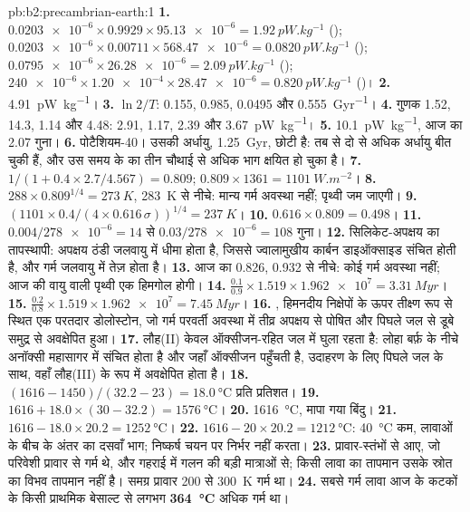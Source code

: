 \begin{solution}{pb:b2:precambrian-earth:1}
\textbf{1.} $\num{0.0203e-6}\times0.9929\times\num{95.13e-6} = \qty{1.92}{pW.kg^{-1}}$
(); $\num{0.0203e-6}\times0.00711\times\num{568.47e-6} = \qty{0.0820}{pW.kg^{-1}}$
(); $\num{0.0795e-6}\times\num{26.28e-6} = \qty{2.09}{pW.kg^{-1}}$ ();
$\num{240e-6}\times\num{1.20e-4}\times\num{28.47e-6} = \qty{0.820}{pW.kg^{-1}}$ ()।
\textbf{2.} \qty{4.91}{pW.kg^{-1}}।
\textbf{3.} $\ln2/T$: 0.155, 0.985, 0.0495 और \qty{0.555}{Gyr^{-1}}।
\textbf{4.} गुणक 1.52, 14.3, 1.14 और 4.48: 2.91, 1.17, 2.39 और \qty{3.67}{pW.kg^{-1}}।
\textbf{5.} \qty{10.1}{pW.kg^{-1}}, आज का 2.07 गुना।
\textbf{6.} पोटैशियम-40। उसकी अर्धायु, \qty{1.25}{Gyr}, छोटी है: तब से दो से अधिक अर्धायु
बीत चुकी हैं, और उस समय के  का तीन चौथाई से अधिक भाग क्षयित हो चुका है।
\textbf{7.} $1/(1 + 0.4\times2.7/4.567) = 0.809$; $0.809\times1361 = \qty{1101}{W.m^{-2}}$।
\textbf{8.} $288\times0.809^{1/4} = \qty{273}{K}$, \qty{283}{K} से नीचे: मान्य गर्म अवस्था नहीं;
पृथ्वी जम जाएगी।
\textbf{9.} $(1101\times0.4/(4\times0.616\,\sigma))^{1/4} = \qty{237}{K}$।
\textbf{10.} $0.616\times0.809 = 0.498$।
\textbf{11.} $0.004/\num{278e-6} = 14$ से $0.03/\num{278e-6} = 108$ गुना।
\textbf{12.} सिलिकेट-अपक्षय का तापस्थापी: अपक्षय ठंडी जलवायु में धीमा होता है, जिससे
ज्वालामुखीय कार्बन डाइऑक्साइड संचित होती है, और गर्म जलवायु में तेज़ होता है।
\textbf{13.} आज का 0.826, 0.932 से नीचे: कोई गर्म अवस्था नहीं; आज की वायु वाली पृथ्वी एक
हिमगोल होगी।
\textbf{14.} $\frac{0.1}{0.9}\times1.519\times\num{1.962e7} = \qty{3.31}{Myr}$।
\textbf{15.} $\frac{0.2}{0.8}\times1.519\times\num{1.962e7} = \qty{7.45}{Myr}$।
\textbf{16.} , हिमनदीय निक्षेपों के ऊपर तीक्ष्ण रूप से स्थित एक परतदार डोलोस्टोन,
जो गर्म परवर्ती अवस्था में तीव्र अपक्षय से पोषित और पिघले जल से डूबे समुद्र से
अवक्षेपित हुआ।
\textbf{17.} लौह(II) केवल ऑक्सीजन-रहित जल में घुला रहता है: लोहा बर्फ़ के नीचे
अनॉक्सी महासागर में संचित होता है और जहाँ ऑक्सीजन पहुँचती है, उदाहरण के लिए पिघले
जल के साथ, वहाँ लौह(III) के रूप में अवक्षेपित होता है।
\textbf{18.} $(1616 - 1450)/(32.2 - 23) = \qty{18.0}{\celsius}$ प्रति प्रतिशत।
\textbf{19.} $1616 + 18.0\times(30 - 32.2) = \qty{1576}{\celsius}$।
\textbf{20.} \qty{1616}{\celsius}, मापा गया बिंदु।
\textbf{21.} $1616 - 18.0\times20.2 = \qty{1252}{\celsius}$।
\textbf{22.} $1616 - 20\times20.2 = \qty{1212}{\celsius}$: \qty{40}{\celsius} कम, लावाओं के बीच के अंतर का
दसवाँ भाग; निष्कर्ष चयन पर निर्भर नहीं करता।
\textbf{23.}  प्रावार-स्तंभों से आए, जो परिवेशी प्रावार से गर्म थे, और गहराई में गलन की बड़ी मात्राओं से;
किसी लावा का तापमान उसके स्रोत का विभव तापमान नहीं है। समग्र
प्रावार 200 से \qty{300}{K} गर्म था।
\textbf{24.} सबसे गर्म  लावा आज के कटकों के किसी प्राथमिक बेसाल्ट से लगभग
\textbf{\qty{364}{\celsius}} अधिक गर्म था।
\end{solution}
